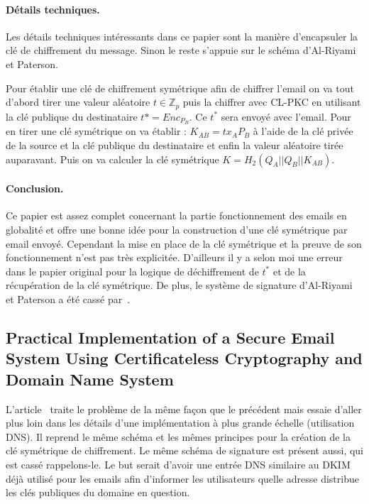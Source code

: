 \paragraph*{Détails techniques.} Les détails techniques intéressants dans ce papier sont la manière d'encapsuler la clé de chiffrement du message. Sinon le reste s'appuie sur le schéma d'Al-Riyami et Paterson.

Pour établir une clé de chiffrement symétrique afin de chiffrer l'email on va tout d'abord tirer une valeur aléatoire $t \in \mathbb{Z}_p$ puis la chiffrer avec CL-PKC en utilisant la clé publique du destinataire $t* = Enc_{P_B}$. Ce $t^*$ sera envoyé avec l'email. Pour en tirer une clé symétrique on va établir : $K_{AB} = tx_AP_B$ à l'aide de la clé privée de la source et la clé publique du destinataire et enfin la valeur aléatoire tirée auparavant. Puis on va calculer la clé symétrique $K = H_2(Q_A||Q_B||K_{AB})$.
\paragraph*{Conclusion.} Ce papier est assez complet concernant la partie fonctionnement des emails en globalité et offre une bonne idée pour la construction d'une clé symétrique par email envoyé. Cependant la mise en place de la clé symétrique et la preuve de son fonctionnement n'est pas très explicitée. D'ailleurs il y a selon moi une erreur dans le papier original pour la logique de déchiffrement de $t^*$ et de la récupération de la clé symétrique. De plus, le système de signature d'Al-Riyami et Paterson a été cassé par~\cite{conf/cans/HuangSMZ05}.

\subsection{Practical Implementation of a Secure Email System Using Certificateless Cryptography and Domain Name System}
L'article~\cite{journals/ijnsec/BalakrishnanR16} traite le problème de la même façon que le précédent mais essaie d'aller plus loin dans les détails d'une implémentation à plus grande échelle (utilisation DNS). Il reprend le même schéma et les mêmes principes pour la création de la clé symétrique de chiffrement. Le même schéma de signature est présent aussi, qui est cassé rappelons-le. Le but serait d'avoir une entrée DNS similaire au DKIM déjà utilisé pour les emails afin d'informer les utilisateurs quelle adresse distribue les clés publiques du domaine en question.

